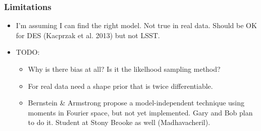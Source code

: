 \documentclass{beamer}
\begin{document}
\frame
{
    \frametitle{Limitations}
    \begin{itemize}

        \item I'm assuming I can find the right model.  Not true in real data.
            Should be OK for DES (Kacprzak et al. 2013) but not LSST.

        \item TODO: 
            
            \begin{itemize}

                \item Why is there bias at all?  Is it the likelhood sampling
                    method?

                \item For real data need a shape prior that is twice
                    differentiable.

                \item Bernstein \& Armstrong propose a model-independent
                    technique using moments in Fourier space, but not yet
                    implemented.  Gary and Bob plan to do it.  Student at Stony
                    Brooke as well (Madhavacheril).

            \end{itemize}

    \end{itemize}
}
\end{document}

